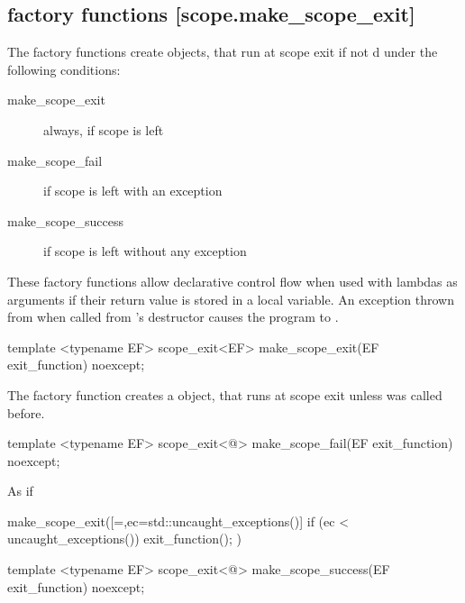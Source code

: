 \documentclass[ebook,11pt,article]{memoir}
\begin{document}
\subsection { factory functions [scope.make_scope_exit]}
\pnum
The factory functions create  objects, that run  at scope exit if not d under the following conditions:
\begin{description}
\item[make_scope_exit ] always, if scope is left
\item[make_scope_fail ] if scope is left with an exception
\item[make_scope_success ] if scope is left without any exception
\end{description}
\pnum
\enternote
These factory functions allow declarative control flow when used with lambdas as arguments if their return value is stored in a local variable. An exception thrown from  when called from 's destructor causes the program to .
\exitnote

\begin{itemdecl}
template <typename EF>
scope_exit<EF> make_scope_exit(EF exit_function) noexcept;
\end{itemdecl}

\begin{itemdescr}
\pnum
The factory function creates a  object, that runs  at scope exit unless  was called before.

\end{itemdescr}

\begin{itemdecl}
template <typename EF>
scope_exit<@\seebelow@> make_scope_fail(EF exit_function) noexcept;
\end{itemdecl}

\begin{itemdescr}
\pnum
\returns As if
\begin{codeblock}
  make_scope_exit([=,ec=std::uncaught_exceptions()]
    {
      if (ec < uncaught_exceptions()) exit_function();
    })
\end{codeblock}
\end{itemdescr}
\begin{itemdecl}
template <typename EF>
scope_exit<@\seebelow@> make_scope_success(EF exit_function) noexcept;
\end{itemdecl}
\end{document}
